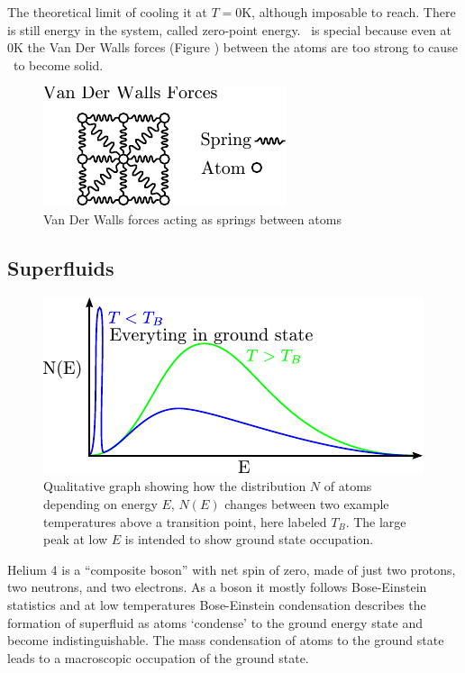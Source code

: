 The theoretical limit of cooling it at $T=0$K, although imposable to reach.
There is still energy in the system, called zero-point energy.
\he\ is special because even at $0$K the Van Der Walls forces (Figure \label{fig:vanderwallsforces}) between the atoms
are too strong to cause \he\ to become solid.


\begin{figure}[htbp]
\centering
\includegraphics{pics/vanderwallsforces.pdf}
\caption{Van Der Walls forces acting as springs between atoms \label{fig:vanderwallsforces}}
\end{figure}


\subsection{Superfluids}
\begin{figure}[htb]
\centering
\includegraphics{pics/groundstateoccupation.pdf}
\caption{Qualitative graph showing how the distribution $N$ of atoms depending on energy $E$, $N(E)$
changes between two example temperatures above a transition point, here labeled $T_B$.
The large peak at low $E$ is intended to show ground state occupation. \label{fig:groundstateoccupation}}
\end{figure}
Helium 4 is a ``composite boson'' with net spin of zero, made of just two protons, two neutrons, and two electrons. As a boson it mostly follows Bose-Einstein statistics and at low temperatures Bose-Einstein condensation describes the formation of superfluid as atoms `condense’ to the ground energy state and become indistinguishable.
The mass condensation of atoms to the ground state leads to a macroscopic occupation of the ground state.

